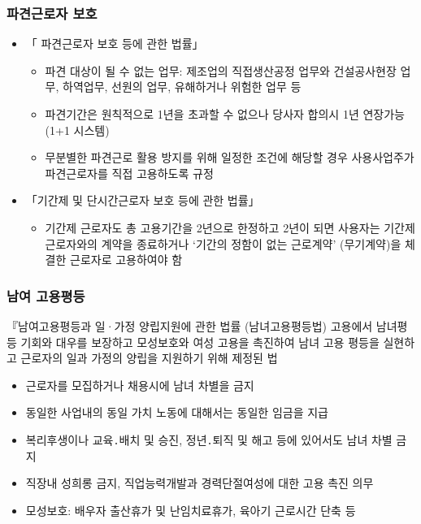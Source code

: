 \documentclass[aspectratio=169,xcolor=dvipsnames,handout]{beamer}
\begin{document}
\begin{frame}
    \frametitle{파견근로자 보호}
    \begin{itemize}[<+->]
        \item 「 파견근로자 보호 등에 관한 법률」
        \begin{itemize}
            \item 파견 대상이 될 수 없는 업무: 제조업의 직접생산공정 업무와 건설공사현장 업무, 하역업무, 선원의 업무, 유해하거나 위험한 업무 등
            \item 파견기간은 원칙적으로 1년을 초과할 수 없으나 당사자 합의시 1년 연장가능 (1+1 시스템)
            \item 무분별한 파견근로 활용 방지를 위해 일정한 조건에 해당할 경우 사용사업주가 파견근로자를 직접 고용하도록 규정
        \end{itemize}
        \item 「기간제 및 단시간근로자 보호 등에 관한 법률」
        \begin{itemize}
            \item 기간제 근로자도 총 고용기간을 2년으로 한정하고 2년이 되면 사용자는 기간제 근로자와의 계약을 종료하거나 `기간의 정함이 없는 근로계약' (무기계약)을 체결한 근로자로 고용하여야 함
        \end{itemize}
    \end{itemize}
\end{frame}

\begin{frame}
    \frametitle{남여 고용평등}
    \begin{block}{『남여고용평등과 일·가정 양립지원에 관한 법률 (남녀고용평등법)}
        고용에서 남녀평등 기회와 대우를 보장하고 모성보호와 여성 고용을 촉진하여 남녀 고용 평등을 실현하고 근로자의 일과 가정의 양립을 지원하기 위해 제정된 법
    \end{block}
    \begin{itemize}
        \item 근로자를 모집하거나 채용시에 남녀 차별을 금지
        \item 동일한 사업내의 동일 가치 노동에 대해서는 동일한 임금을 지급
        \item 복리후생이나 교육․배치 및 승진, 정년․퇴직 및 해고 등에 있어서도 남녀 차별 금지
        \item 직장내 성희롱 금지, 직업능력개발과 경력단절여성에 대한 고용 촉진 의무
        \item 모성보호: 배우자 출산휴가 및 난임치료휴가, 육아기 근로시간 단축 등 
    \end{itemize}
\end{frame}
\end{document}
